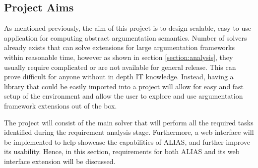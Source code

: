 \subsection{Project Aims}
As mentioned previously, the aim of this project is to design scalable, easy to use application for computing abstract argumentation semantics. Number of solvers already exists that can solve extensions for large argumentation frameworks within reasonable time, however as shown in section \ref{section:analysis}, they usually require complicated or are not available for general release. This can prove difficult for anyone without in depth IT knowledge. Instead, having a library that could be easily imported into a project will allow for easy and fast setup of the environment and allow the user to explore and use argumentation framework extensions out of the box.

The project will consist of the main solver that will perform all the required tasks identified during the requirement analysis stage. Furthermore, a web interface will be implemented to help showcase the capabilities of ALIAS, and further improve its usability. Hence, in this section, requirements for both ALIAS and its web interface extension will be discussed. 
